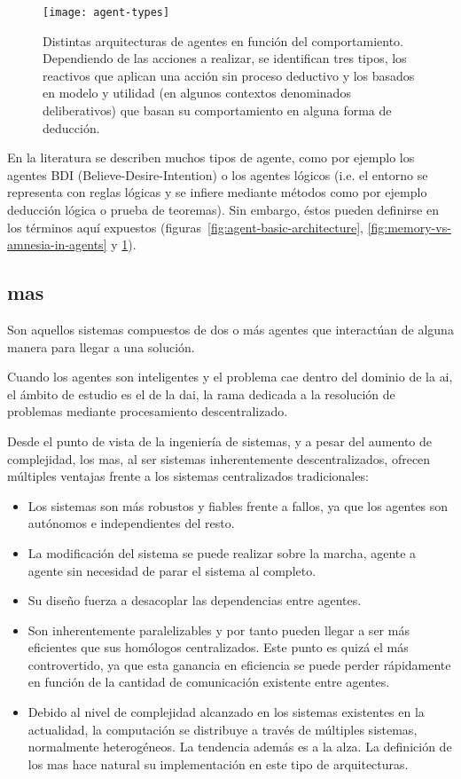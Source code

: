 \begin{figure}[t]
	\texttt{[image: agent-types]}
	\caption[Arquitecturas de agente según su comportamiento.]{Distintas arquitecturas de agentes en función del comportamiento. Dependiendo de las acciones a realizar, se identifican tres tipos, los reactivos que aplican una acción sin proceso deductivo y los basados en modelo y utilidad (en algunos contextos denominados deliberativos) que basan su comportamiento en alguna forma de deducción.}
	\label{fig:agent-types}
\end{figure}

En la literatura se describen muchos tipos de agente, como por ejemplo los agentes BDI (Believe-Desire-Intention) o los agentes lógicos (i.e. el entorno se representa con reglas lógicas y se infiere mediante métodos como por ejemplo deducción lógica o prueba de teoremas). Sin embargo, éstos pueden definirse en los términos aquí expuestos (figuras~\ref{fig:agent-basic-architecture}, \ref{fig:memory-vs-amnesia-in-agents} y \ref{fig:agent-types}). 

\subsection{\gls{mas}}

Son aquellos sistemas compuestos de dos o más agentes que interactúan de alguna manera para llegar a una solución.

Cuando los agentes son inteligentes y el problema cae dentro del dominio de la \gls{ai}, el ámbito de estudio es el de la \gls{dai}, la rama dedicada a la resolución de problemas mediante procesamiento descentralizado.

Desde el punto de vista de la ingeniería de sistemas, y a pesar del aumento de complejidad, los \gls{mas}, al ser sistemas inherentemente descentralizados, ofrecen múltiples ventajas frente a los sistemas centralizados tradicionales:

\begin{itemize}
	\item Los sistemas son más robustos y fiables frente a fallos, ya que los agentes son autónomos e independientes del resto.
	\item La modificación del sistema se puede realizar sobre la marcha, agente a agente sin necesidad de parar el sistema al completo.
	\item Su diseño fuerza a desacoplar las dependencias entre agentes.
	\item Son inherentemente paralelizables y por tanto pueden llegar a ser más eficientes que sus homólogos centralizados. Este punto es quizá el más controvertido, ya que esta ganancia en eficiencia se puede perder rápidamente en función de la cantidad de comunicación existente entre agentes.
	\item Debido al nivel de complejidad alcanzado en los sistemas existentes en la actualidad, la computación se distribuye a través de múltiples sistemas, normalmente heterogéneos. La tendencia además es a la alza. La definición de los \gls{mas} hace natural su implementación en este tipo de arquitecturas.
\end{itemize}

